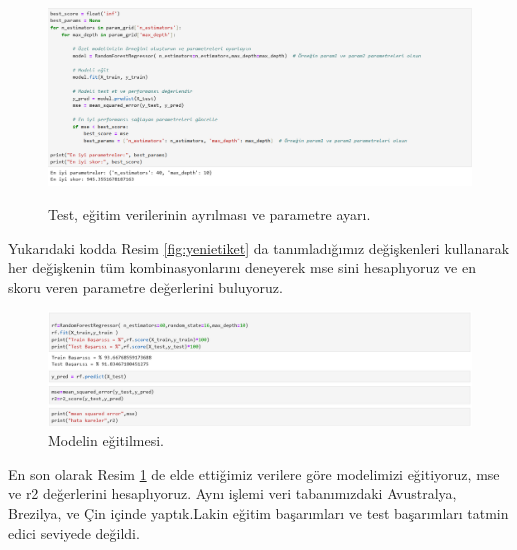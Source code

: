 \documentclass[12pt, a4paper]{article}
\begin{document}
	\begin{figure}[!htbp] 
		
		\centering
		\includegraphics[angle=0, width=\textwidth]{11.png}
		\label{fig:yenietiket2}
		\caption{Test, eğitim verilerinin ayrılması ve parametre ayarı.}
	\end{figure}
	Yukarıdaki kodda Resim \ref{fig:yenietiket} da tanımladığımız değişkenleri kullanarak her değişkenin tüm kombinasyonlarını deneyerek mse sini hesaplıyoruz ve en skoru veren parametre değerlerini buluyoruz.
	
	
	\begin{figure}[!htbp] 
		
		\centering
		\includegraphics[angle=0, width=\textwidth]{13.png}
		\caption{Modelin eğitilmesi.}
	\end{figure}
	\newpage
	En son olarak Resim \ref{fig:yenietiket2} de elde ettiğimiz verilere göre modelimizi eğitiyoruz, mse ve r2 değerlerini hesaplıyoruz.
	\newline
	\newline
	Aynı işlemi veri tabanımızdaki Avustralya, Brezilya, ve Çin içinde yaptık.Lakin eğitim başarımları ve test başarımları tatmin edici seviyede değildi.
	
\end{document}
